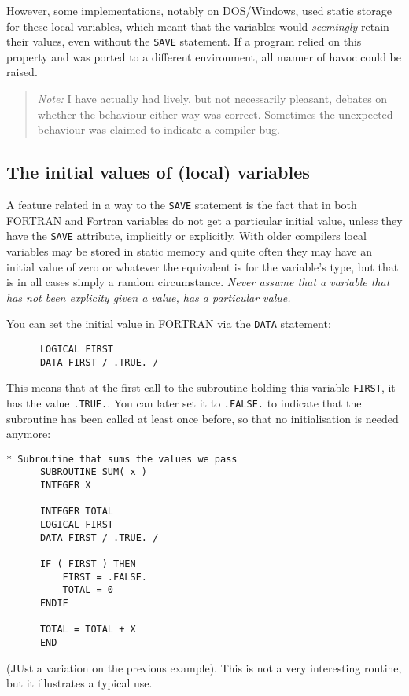 However, some implementations, notably on DOS/Windows, used static
storage for these local variables, which meant that the variables would
\emph{seemingly} retain their values, even without the \verb+SAVE+ statement.
If a program relied on this property and was ported to a different environment,
all manner of havoc could be raised.

\begin{quote}
\emph{Note:} I have actually had lively, but not necessarily pleasant, debates on
whether the behaviour either way was correct. Sometimes the unexpected
behaviour was claimed to indicate a compiler bug.
\end{quote}

\subsection{The initial values of (local) variables}
A feature related in a way to the \verb+SAVE+ statement is the fact that
in both FORTRAN and Fortran variables do not get a particular initial
value, unless they have the \verb+SAVE+ attribute, implicitly or explicitly.
With older compilers local variables may be stored in static memory and
quite often they may have an initial value of zero or whatever the
equivalent is for the variable's type, but that is in all cases simply
a random circumstance. \emph{Never assume that a variable that has not
been explicity given a value, has a particular value.}

You can set the initial value in FORTRAN via the \verb+DATA+ statement:
%
\begin{verbatim}
      LOGICAL FIRST
      DATA FIRST / .TRUE. /
\end{verbatim}

This means that at the first call to the subroutine holding this variable
\verb+FIRST+, it has the value \verb+.TRUE.+. You can later set it to
\verb+.FALSE.+ to indicate that the subroutine has been called at least once
before, so that no initialisation is needed anymore:
%
\begin{verbatim}
* Subroutine that sums the values we pass
      SUBROUTINE SUM( x )
      INTEGER X

      INTEGER TOTAL
      LOGICAL FIRST
      DATA FIRST / .TRUE. /

      IF ( FIRST ) THEN
          FIRST = .FALSE.
          TOTAL = 0
      ENDIF

      TOTAL = TOTAL + X
      END
\end{verbatim}
(JUst a variation on the previous example). This is not a very interesting routine,
but it illustrates a typical use.

